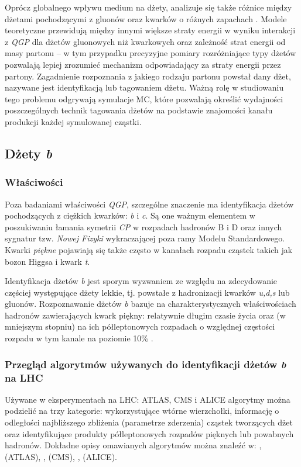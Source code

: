 Oprócz globalnego wpływu medium na dżety, analizuje się także różnice między dżetami pochodzącymi z gluonów oraz kwarków o różnych zapachach . Modele teoretyczne przewidują między innymi większe straty energii w wyniku interakcji z \textit{QGP} dla dżetów gluonowych niż kwarkowych \cite{Salgado:2003gb} oraz zależność strat energii od masy partonu \cite{Dokshitzer:2001zm} -- w tym przypadku precyzyjne pomiary rozróżniające typy dżetów pozwalają lepiej zrozumieć mechanizm odpowiadający za straty energii przez partony. Zagadnienie rozpoznania z jakiego rodzaju partonu powstał dany dżet, nazywane jest identyfikacją lub tagowaniem dżetu.
Ważną rolę w studiowaniu tego problemu odgrywają symulacje MC, które pozwalają określić wydajności poszczególnych technik tagowania dżetów na podstawie znajomości kanału produkcji każdej symulowanej cząstki.

\subsection{Dżety \textit{b}}
\label{subsec:b-dzety}

\subsubsection{Właściwości}
Poza badaniami właściwości \textit{QGP}, szczególne znaczenie ma identyfikacja dżetów pochodzących z ciężkich kwarków: \textit{b} i \textit{c}.
Są one ważnym elementem w poszukiwaniu łamania symetrii \textit{CP} w rozpadach hadronów B i D oraz innych sygnatur tzw. \textit{Nowej Fizyki} wykraczającej poza ramy Modelu Standardowego. 
Kwarki \textit{piękne} pojawiają się także często w kanałach rozpadu cząstek takich jak bozon Higgsa i kwark \textit{t}.

Identyfikacja dżetów \textit{b} jest sporym wyzwaniem ze względu na zdecydowanie częściej występujące dżety lekkie, tj. powstałe z hadronizacji kwarków \textit{u,d,s} lub gluonów.
Rozpoznawanie dżetów \textit{b} bazuje na charakterystycznych właściwościach hadronów zawierających kwark piękny: relatywnie długim czasie życia oraz (w mniejszym stopniu) na ich półleptonowych rozpadach o względnej częstości rozpadu w tym kanale  na poziomie 10\% \cite{Patrignani:2016xqp}.

\subsubsection{Przegląd algorytmów używanych do identyfikacji dżetów \textit{b} na LHC} 
\label{subsubsec:przeglad-algo}
Używane w eksperymentach na LHC: ATLAS, CMS i ALICE algorytmy można podzielić na trzy kategorie: wykorzystujące wtórne wierzchołki,  informację o odległości najbliższego zbliżenia (parametrze zderzenia) cząstek tworzących dżet  oraz identyfikujące produkty półleptonowych rozpadów pięknych lub powabnych hadronów. Dokładne opisy omawianych algorytmów można znaleźć w: \cite{Aad:2015ydr}, \cite{Aaboud:2018xwy} (ATLAS), \cite{Chatrchyan:2012jua}, \cite{Sirunyan:2017ezt} (CMS), \cite{Feldkamp:2013cya}, \cite{Haake:2017dpr} (ALICE).

